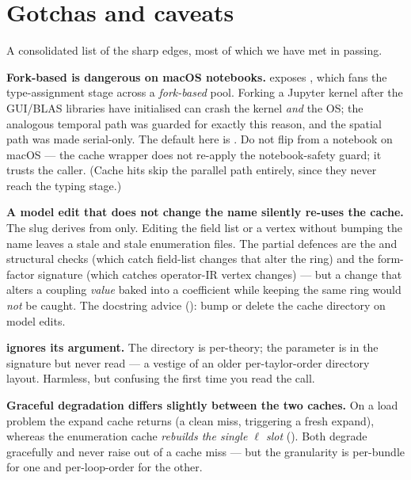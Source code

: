 \section{Gotchas and caveats}

A consolidated list of the sharp edges, most of which we have met in passing.

\begin{gotcha}
\textbf{Fork-based  is dangerous on macOS notebooks.}
 exposes , which fans the
type-assignment stage across a \emph{fork-based} pool. Forking a Jupyter kernel
after the GUI/BLAS libraries have initialised can crash the kernel \emph{and}
the OS; the analogous temporal path was guarded for exactly this reason, and the
spatial path was made serial-only. The default here is . Do
not flip  from a notebook on macOS --- the cache wrapper
does not re-apply the notebook-safety guard; it trusts the caller. (Cache hits
skip the parallel path entirely, since they never reach the typing stage.)
\end{gotcha}

\begin{gotcha}
\textbf{A model edit that does not change the name silently re-uses the cache.}
The slug derives from  only. Editing the field list or a
vertex without bumping the name leaves a stale  and
stale enumeration files. The partial defences are the 
and  structural checks (which catch field-list changes that alter
the ring) and the form-factor signature (which catches operator-IR vertex
changes) --- but a change that alters a coupling \emph{value} baked into a
coefficient while keeping the same ring would \emph{not} be caught. The
docstring advice (): bump  or
delete the cache directory on model edits.
\end{gotcha}

\begin{gotcha}
\textbf{ ignores its  argument.}
The directory is per-theory; the parameter is in the signature but never read ---
a vestige of an older per-taylor-order directory layout. Harmless, but confusing
the first time you read the call.
\end{gotcha}

\begin{gotcha}
\textbf{Graceful degradation differs slightly between the two caches.} On a load
problem the expand cache returns  (a clean miss, triggering a fresh
expand), whereas the enumeration cache \emph{rebuilds the single $\ell$ slot}
(). Both degrade gracefully and never raise out of
a cache miss --- but the granularity is per-bundle for one and per-loop-order
for the other.
\end{gotcha}

